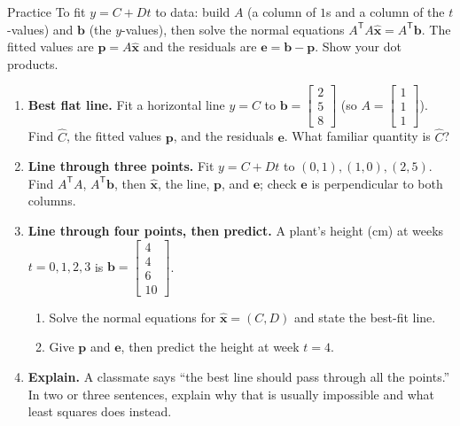 \documentclass[10pt]{article}
\newcommand{\xx}{\mathbf{x}}
\newcommand{\bb}{\mathbf{b}}
\newcommand{\pp}{\mathbf{p}}
\newcommand{\ee}{\mathbf{e}}
\newcommand{\T}{\mathsf{T}}
\begin{document}
\namedateperiod

\vspace{0.12in}

\begin{notesbox}{Practice}
To fit $y=C+Dt$ to data: build $A$ (a column of $1$s and a column of the $t$-values) and $\bb$ (the
$y$-values), then solve the normal equations $A^{\T}A\hat{\xx}=A^{\T}\bb$. The fitted values are
$\pp=A\hat{\xx}$ and the residuals are $\ee=\bb-\pp$. Show your dot products.

\begin{enumerate}[leftmargin=1.9em, itemsep=11pt]
  \item \textbf{Best flat line.} Fit a horizontal line $y=C$ to $\bb=\begin{bmatrix} 2\\5\\8 \end{bmatrix}$
        (so $A=\begin{bmatrix} 1\\1\\1 \end{bmatrix}$). Find $\hat{C}$, the fitted values $\pp$, and the
        residuals $\ee$. What familiar quantity is $\hat{C}$? 
  \item \textbf{Line through three points.} Fit $y=C+Dt$ to $(0,1),(1,0),(2,5)$. Find $A^{\T}A$,
        $A^{\T}\bb$, then $\hat{\xx}$, the line, $\pp$, and $\ee$; check $\ee$ is perpendicular to both
        columns. 
  \item \textbf{Line through four points, then predict.} A plant's height (cm) at weeks $t=0,1,2,3$ is
        $\bb=\begin{bmatrix} 4\\4\\6\\10 \end{bmatrix}$.
    \begin{enumerate}[label=(\alph*), leftmargin=1.8em, itemsep=5pt]
      \item Solve the normal equations for $\hat{\xx}=(C,D)$ and state the best-fit line. \vspace{1.2cm}
      \item Give $\pp$ and $\ee$, then predict the height at week $t=4$. \vspace{1.0cm}
    \end{enumerate}
  \item \textbf{Explain.} A classmate says ``the best line should pass through all the points.'' In two or
        three sentences, explain why that is usually impossible and what least squares does instead.
\end{enumerate}
\end{notesbox}
\end{document}
